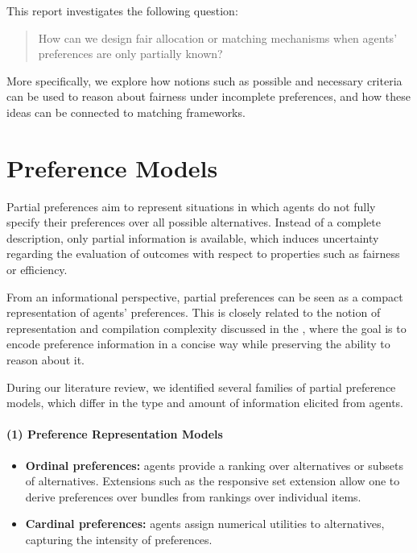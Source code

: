 \documentclass{article}
\begin{document}
This report investigates the following question:

\begin{quote}
How can we design fair allocation or matching mechanisms when agents' preferences are only partially known?
\end{quote}

More specifically, we explore how notions such as possible and necessary criteria can be used to reason about fairness under incomplete preferences, and how these ideas can be connected to matching frameworks.


\section{Preference Models}

Partial preferences aim to represent situations in which agents do not fully specify their preferences over all possible alternatives. 
Instead of a complete description, only partial information is available, which induces uncertainty regarding the evaluation of outcomes with respect to properties such as fairness or efficiency.

From an informational perspective, partial preferences can be seen as a compact representation of agents' preferences. 
This is closely related to the notion of representation and compilation complexity discussed in the \cite[Chapter 10, section 10.7]{brandt2016handbook}, where the goal is to encode preference information in a concise way while preserving the ability to reason about it.

During our literature review, we identified several families of partial preference models, which differ in the type and amount of information elicited from agents.

\paragraph{(1) Preference Representation Models}

\begin{itemize}
    \item \textbf{Ordinal preferences:} agents provide a ranking over alternatives or subsets of alternatives. Extensions such as the responsive set extension \citep{bouveret2010fair} allow one to derive preferences over bundles from rankings over individual items.
    \item \textbf{Cardinal preferences:} agents assign numerical utilities to alternatives, capturing the intensity of preferences.
\end{itemize}
\end{document}

